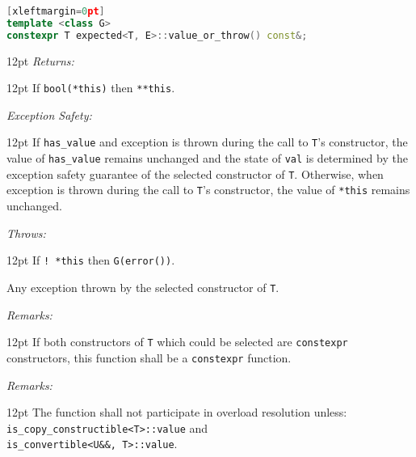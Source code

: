 \documentclass[a4paper,10pt]{article}
\newcommand{\cpp}[1]{\lstinline{#1}}
\newcommand{\wordingItem}[1]{\noindent\textit{#1:}}
\newenvironment{wordingTextItem}[1]{\wordingItem{#1}\vspace{2pt}\noindent\begin{adjustwidth}{12pt}{}}{\vspace{2pt}\end{adjustwidth}}
\newenvironment{wordingPara}{\begin{adjustwidth}{12pt}{}}{\end{adjustwidth}}
\begin{document}
\begin{lstlisting}[language=C++][xleftmargin=0pt]
template <class G>
constexpr T expected<T, E>::value_or_throw() const&; 
\end{lstlisting}
\begin{wordingPara}
\begin{wordingTextItem}{Returns}
If \cpp{bool(*this)} then \cpp{**this}.
\end{wordingTextItem}
\begin{wordingTextItem}{Exception Safety}
If \cpp{has_value} and exception is thrown during the call to \cpp{T}'s constructor, the value of \cpp{has_value} remains unchanged and the state of \cpp{val} is determined by the exception safety guarantee of the selected constructor of \cpp{T}. Otherwise, when exception is thrown during the call to \cpp{T}'s constructor, the value of \cpp{*this} remains unchanged.
\end{wordingTextItem}
\begin{wordingTextItem}{Throws}
If \cpp{! *this} then \cpp{G(error())}.

\noindent
Any exception thrown by the selected constructor of \cpp{T}.
\end{wordingTextItem}
\begin{wordingTextItem}{Remarks}
If both constructors of \cpp{T} which could be selected are \cpp{constexpr} constructors, this function shall be a \cpp{constexpr} function.
\end{wordingTextItem}
\begin{wordingTextItem}{Remarks}
The function shall not participate in overload resolution unless: \\
\cpp{is_copy_constructible<T>::value} and \\
\cpp{is_convertible<U&&, T>::value}.
\end{wordingTextItem}
\end{wordingPara}
\end{document}

